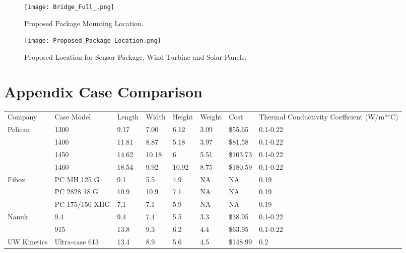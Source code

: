 \begin{figure}[ht]
\centering
\texttt{[image: Bridge\_Full\_.png]}
\caption{Proposed Package Mounting Location.}
\label{fig:PackageLocation}
\end{figure}


\begin{figure}[ht]
\centering
\texttt{[image: Proposed\_Package\_Location.png]}
\caption{Proposed Location for Sensor Package, Wind Turbine and Solar Panels.}
\label{fig:Proposed Package, Panels and Turbine Location}
\end{figure}




\section{Appendix Case Comparison}
\begin{table}[h]
\begin{tabular}{lllllllp{3cm}}
Company     & Case Model     & Length & Width & Height & Weight & Cost     & Thermal Conductivity Coefficient (W/m*$^{\circ}$C) \\
Pelican     & 1300           & 9.17   & 7.00  & 6.12   & 3.09   & \$55.65  & 0.1-0.22                                              \\
~           & 1400           & 11.81  & 8.87  & 5.18   & 3.97   & \$81.58  & 0.1-0.22                                              \\
~           & 1450           & 14.62  & 10.18 & 6      & 5.51   & \$103.73 & 0.1-0.22                                              \\
~           & 1460           & 18.54  & 9.92  & 10.92  & 8.75   & \$180.59 & 0.1-0.22                                              \\
Fibox       & PC MH 125 G    & 9.1    & 5.5   & 4.9    & NA     & NA       & 0.19                                                  \\
~           & PC 2828 18 G   & 10.9   & 10.9  & 7.1    & NA     & NA       & 0.19                                                  \\
~           & PC 175/150 XHG & 7.1    & 7.1   & 5.9    & NA     & NA       & 0.19                                                  \\
Nanuk       & 9.4            & 9.4    & 7.4   & 5.5    & 3.3    & \$38.95  & 0.1-0.22                                              \\
~           & 915            & 13.8   & 9.3   & 6.2    & 4.4    & \$63.95  & 0.1-0.22                                              \\
UW Kinetics & Ultra-case 613 & 13.4   & 8.9   & 5.6    & 4.5    & \$148.99 & 0.2                                                   \\
\end{tabular}
\end{table}
